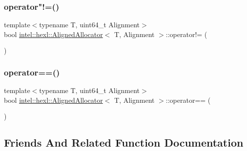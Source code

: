 \subsubsection{\texorpdfstring{operator"!=()}{operator!=()}}
{\footnotesize\ttfamily template$<$typename T, uint64\+\_\+t Alignment$>$ \\
bool \hyperlink{classintel_1_1hexl_1_1AlignedAllocator}{intel\+::hexl\+::\+Aligned\+Allocator}$<$ T, Alignment $>$\+::operator!= (\begin{DoxyParamCaption}\item[{const \hyperlink{classintel_1_1hexl_1_1AlignedAllocator}{Aligned\+Allocator}$<$ T, Alignment $>$ \&}]{ }\end{DoxyParamCaption})\hspace{0.3cm}{\ttfamily [inline]}}

\mbox{\label{classintel_1_1hexl_1_1AlignedAllocator_a6f8f9c34b0ddab249c945ddb6609c6dd}} 
\subsubsection{\texorpdfstring{operator==()}{operator==()}}
{\footnotesize\ttfamily template$<$typename T, uint64\+\_\+t Alignment$>$ \\
bool \hyperlink{classintel_1_1hexl_1_1AlignedAllocator}{intel\+::hexl\+::\+Aligned\+Allocator}$<$ T, Alignment $>$\+::operator== (\begin{DoxyParamCaption}\item[{const \hyperlink{classintel_1_1hexl_1_1AlignedAllocator}{Aligned\+Allocator}$<$ T, Alignment $>$ \&}]{ }\end{DoxyParamCaption})\hspace{0.3cm}{\ttfamily [inline]}}



\subsection{Friends And Related Function Documentation}
\mbox{\label{classintel_1_1hexl_1_1AlignedAllocator_aaded07599020ca35e89e078674263c63}} 
